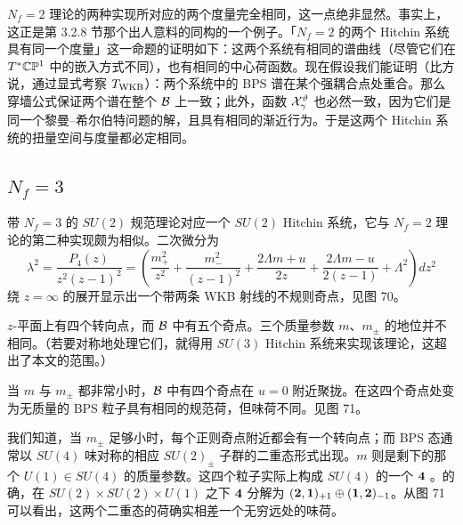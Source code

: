 $N_f=2$ 理论的两种实现所对应的两个\hk 度量完全相同，这一点绝非显然。事实上，这正是第 3.2.8 节那个出人意料的同构的一个例子。「$N_f=2$ 的两个 Hitchin 系统具有同一个\hk 度量」这一命题的证明如下：这两个系统有相同的谱曲线（尽管它们在 $T^* \mathbb{C} \mathbb{P}^1$ 中的嵌入方式不同），也有相同的中心荷函数。现在假设我们能证明（比方说，通过显式考察 $T_{\rm WKB}$）：两个系统中的 BPS 谱在某个强耦合点处重合。那么穿墙公式保证两个谱在整个 $\mathcal{B}$ 上一致；此外，函数 $\mathcal{X}^\vartheta_\gamma$ 也必然一致，因为它们是同一个黎曼–希尔伯特问题的解，且具有相同的渐近行为。于是这两个 Hitchin 系统的扭量空间与\hk 度量都必定相同。

\subsection{$N_f=3$} \label{subsec:Nf3}

带 $N_f=3$ 的 $SU(2)$ 规范理论对应一个 $SU(2)$ Hitchin 系统，它与 $N_f=2$ 理论的第二种实现颇为相似。二次微分为
\begin{equation}
\lambda^2 = \frac{P_4(z)}{z^2 (z-1)^2} = \left(
\frac{m_+^2}{z^2}+\frac{m_-^2}{(z-1)^2} + \frac{2\Lambda m +u}{2 z}
+ \frac{2 \Lambda m -u}{2 (z-1) } + \Lambda^2\right) dz^2
\end{equation}
绕 $z=\infty$ 的展开显示出一个带两条 WKB 射线的不规则奇点，见图 70。

$z$-平面上有四个转向点，而 $\mathcal{B}$ 中有五个奇点。三个质量参数 $m$、$m_\pm$ 的地位并不相同。（若要对称地处理它们，就得用 $SU(3)$ Hitchin 系统来实现该理论，这超出了本文的范围。）

当 $m$ 与 $m_\pm$ 都非常小时，$\mathcal{B}$ 中有四个奇点在 $u=0$ 附近聚拢。在这四个奇点处变为无质量的 BPS 粒子具有相同的规范荷，但味荷不同。见图 71。

我们知道，当 $m_\pm$ 足够小时，每个正则奇点附近都会有一个转向点；而 BPS 态通常以 $SU(4)$ 味对称的相应 $SU(2)_\pm$ 子群的二重态形式出现。$m$ 则是剩下的那个 $U(1)\in SU(4)$ 的质量参数。这四个粒子实际上构成 $SU(4)$ 的一个 ${\bf 4}$ \cite{Seiberg:1994aj}。的确，在 $SU(2)\times SU(2)\times U(1)$ 之下 ${\bf 4}$ 分解为 $({\bf 2},{\bf 1})_{+1}\oplus({\bf 1},{\bf 2})_{-1}$。从图 71 可以看出，这两个二重态的荷确实相差一个无穷远处的味荷。

